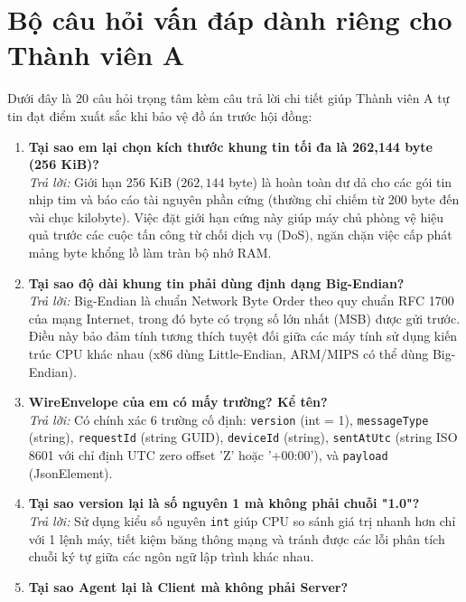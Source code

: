 \documentclass[12pt,a4paper]{article}
\begin{document}
\section{Bộ câu hỏi vấn đáp dành riêng cho Thành viên A}

Dưới đây là 20 câu hỏi trọng tâm kèm câu trả lời chi tiết giúp Thành viên A tự tin đạt điểm xuất sắc khi bảo vệ đồ án trước hội đồng:

\begin{enumerate}[leftmargin=*, label=\textbf{Câu \arabic*:}]
  \item \textbf{Tại sao em lại chọn kích thước khung tin tối đa là 262,144 byte (256 KiB)?} \\
    \textit{Trả lời:} Giới hạn 256 KiB ($262{,}144$ byte) là hoàn toàn dư dả cho các gói tin nhịp tim và báo cáo tài nguyên phần cứng (thường chỉ chiếm từ 200 byte đến vài chục kilobyte). Việc đặt giới hạn cứng này giúp máy chủ phòng vệ hiệu quả trước các cuộc tấn công từ chối dịch vụ (DoS), ngăn chặn việc cấp phát mảng byte khổng lồ làm tràn bộ nhớ RAM.
  \item \textbf{Tại sao độ dài khung tin phải dùng định dạng Big-Endian?} \\
    \textit{Trả lời:} Big-Endian là chuẩn Network Byte Order theo quy chuẩn RFC 1700 của mạng Internet, trong đó byte có trọng số lớn nhất (MSB) được gửi trước. Điều này bảo đảm tính tương thích tuyệt đối giữa các máy tính sử dụng kiến trúc CPU khác nhau (x86 dùng Little-Endian, ARM/MIPS có thể dùng Big-Endian).
  \item \textbf{WireEnvelope của em có mấy trường? Kể tên?} \\
    \textit{Trả lời:} Có chính xác 6 trường cố định: \texttt{version} (int = 1), \texttt{messageType} (string), \texttt{requestId} (string GUID), \texttt{deviceId} (string), \texttt{sentAtUtc} (string ISO 8601 với chỉ định UTC zero offset 'Z' hoặc '+00:00'), và \texttt{payload} (JsonElement).
  \item \textbf{Tại sao version lại là số nguyên 1 mà không phải chuỗi "1.0"?} \\
    \textit{Trả lời:} Sử dụng kiểu số nguyên \texttt{int} giúp CPU so sánh giá trị nhanh hơn chỉ với 1 lệnh máy, tiết kiệm băng thông mạng và tránh được các lỗi phân tích chuỗi ký tự giữa các ngôn ngữ lập trình khác nhau.
  \item \textbf{Tại sao Agent lại là Client mà không phải Server?} \\

\end{enumerate}
\end{document}
